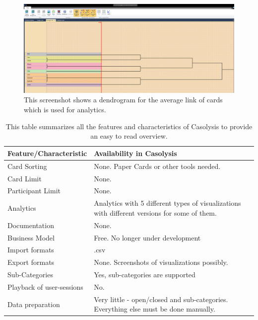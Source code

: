 \begin{figure}[tp] 
\centering
\includegraphics[keepaspectratio,width=\linewidth,height=\halfh]{images/casolysis-diagram-2.png}
\caption[Casolysis Dendrogram] { This screenshot shows a dendrogram 
for the average link of cards which is used for analytics.
 }
\label{fig:Casolysis3}
\end{figure}

\begin{table}[tp]
\centering
\begin{tabularx}
{\linewidth}{|l|X|}
\hline \textbf{Feature/Characteristic} & \textbf{Availability in Casolysis} \\ 
\hline Card Sorting & None. Paper Cards or other tools needed. \\ 
\hline Card Limit & None. \\
\hline Participant Limit & None. \\
\hline Analytics & Analytics with 5 different types of visualizations
with different versions for some of them. \\ 
\hline Documentation & None. \\
\hline Business Model & Free. No longer under development \\
\hline Import formats & .csv\\ 
\hline Export formats & None. Screenshots of visualizations possibly. \\ 
\hline Sub-Categories & Yes, sub-categories are supported \\ 
\hline Playback of user-sessions & No. \\ 
\hline Data preparation & Very little - open/closed and sub-categories.
Everything else must be done manually. \\ 
\hline
\end{tabularx} 
\caption[Feature summary of Casolysis] 
{ 
This table summarizes all the features and characteristics of Casolysis
to provide an easy to read overview.
}
\label{tab:features-Casolysis}
\end{table}


